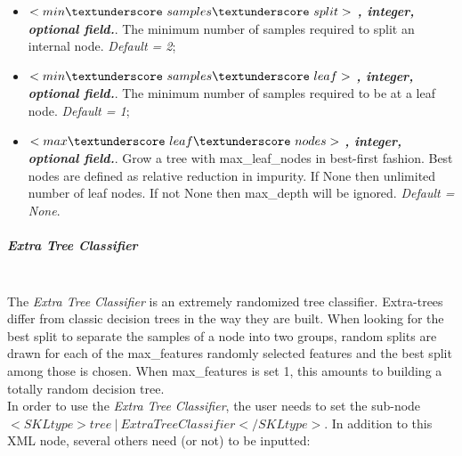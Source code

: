 \begin{itemize}
\item $<min\textunderscore~samples\textunderscore~split>$ \textbf{\textit{, integer, optional field.}}. The minimum number of samples required to split an internal node. \textit{Default = 2};
\item $<min\textunderscore~samples\textunderscore~leaf>$ \textbf{\textit{, integer, optional field.}}. The minimum number of samples required to be at a leaf node. \textit{Default = 1};
\item $<max\textunderscore~leaf\textunderscore~nodes>$ \textbf{\textit{, integer, optional field.}}. Grow a tree with max\_leaf\_nodes in best-first fashion. Best nodes are defined as relative reduction in impurity. If None then unlimited number of leaf nodes. If not None then max\_depth will be ignored. \textit{Default = None}.
\end{itemize}
\subparagraph{Extra Tree Classifier}
\mbox{}
\\The \textit{Extra Tree Classifier} is an extremely randomized tree classifier.
Extra-trees differ from classic decision trees in the way they are built. When looking for the best split to separate the samples of a node into two groups, random splits are drawn for each of the max\_features randomly selected features and the best split among those is chosen. When max\_features is set 1, this amounts to building a totally random decision tree.
\\In order to use the \textit{Extra Tree Classifier}, the user needs to set the sub-node $<SKLtype>tree~\vert~ExtraTreeClassifier</SKLtype>$. In addition to this XML node, several others need (or not) to be inputted:

